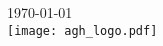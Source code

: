 \begin{titlepage}
{\large \today}\\[1cm] %


\texttt{[image: agh\_logo.pdf]}\\[1cm] %
 

\vfill %
\end{titlepage}